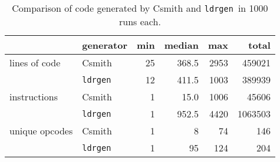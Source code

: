 \documentclass{llncs}
\newcommand\ldrgen{\texttt{ldrgen}}
\begin{document}
\begin{table}
\caption{Comparison of code generated by Csmith and \ldrgen\ in 1000 runs
each.}
\label{tab:results}

\centering
\begin{tabular}{l@{\ } | @{\ }l @{\quad} r @{\quad} r @{\quad} r @{\quad} r}

& generator & min & median & max & total \\
\hline
%
%
%
lines of code & Csmith
    & 25 & 368.5 & 2953 & 459021 \\
& \ldrgen
    & 12 & 411.5 & 1003 & 389939
    \\[1ex]
instructions & Csmith
    & 1 &  15.0 & 1006 &   45606 \\
& \ldrgen
    & 1 & 952.5 & 4420 & 1063503
    \\[1ex]
unique opcodes & Csmith
    & 1 &  8 &  74 & 146 \\
& \ldrgen
    & 1 & 95 & 124 & 204
    \\
%
%
\end{tabular}
\end{table}

\end{document}
